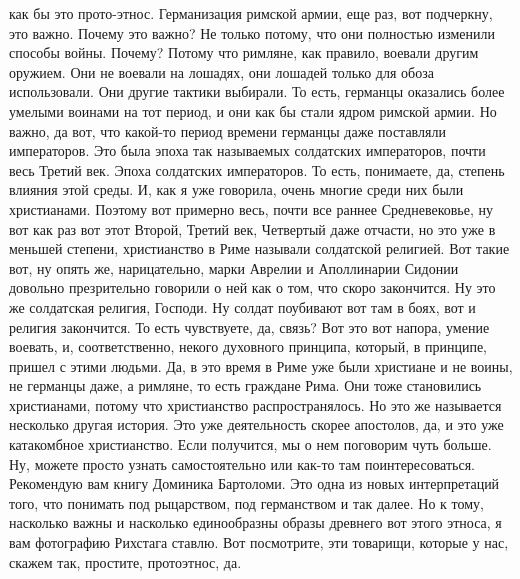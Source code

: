 как бы это прото-этнос. Германизация римской армии, еще раз, вот подчеркну, это
важно. Почему это важно? Не только потому, что они полностью изменили способы
войны. Почему? Потому что римляне, как правило, воевали другим оружием. Они не
воевали на лошадях, они лошадей только для обоза использовали. Они другие
тактики выбирали. То есть, германцы оказались более умелыми воинами на тот
период, и они как бы стали ядром римской армии. Но важно, да вот, что какой-то
период времени германцы даже поставляли императоров. Это была эпоха так
называемых солдатских императоров, почти весь Третий век. Эпоха солдатских
императоров. То есть, понимаете, да, степень влияния этой среды. И, как я уже
говорила, очень многие среди них были христианами. Поэтому вот примерно весь,
почти все раннее Средневековье, ну вот как раз вот этот Второй, Третий век,
Четвертый даже отчасти, но это уже в меньшей степени, христианство в Риме
называли солдатской религией. Вот такие вот, ну опять же, нарицательно, марки
Аврелии и Аполлинарии Сидонии довольно презрительно говорили о ней как о том,
что скоро закончится. Ну это же солдатская религия, Господи. Ну солдат поубивают
вот там в боях, вот и религия закончится. То есть чувствуете, да, связь? Вот это
вот напора, умение воевать, и, соответственно, некого духовного принципа,
который, в принципе, пришел с этими людьми. Да, в это время в Риме уже были
христиане и не воины, не германцы даже, а римляне, то есть граждане Рима. Они
тоже становились христианами, потому что христианство распространялось. Но это
же называется несколько другая история. Это уже деятельность скорее апостолов,
да, и это уже катакомбное христианство. Если получится, мы о нем поговорим чуть
больше. Ну, можете просто узнать самостоятельно или как-то там поинтересоваться.
Рекомендую вам книгу Доминика Бартоломи. Это одна из новых интерпретаций того,
что понимать под рыцарством, под германством и так далее. Но к тому, насколько
важны и насколько единообразны образы древнего вот этого этноса, я вам
фотографию Рихстага ставлю. Вот посмотрите, эти товарищи, которые у нас, скажем
так, простите, протоэтнос, да. 

